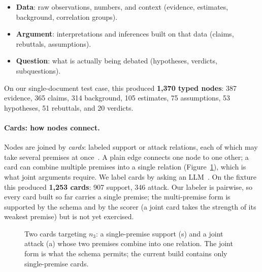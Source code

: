 \documentclass{article}
\begin{document}
\begin{itemize}
    \item \textbf{Data}: raw observations, numbers, and context (evidence,
        estimates, background, correlation groups).
    \item \textbf{Argument}: interpretations and inferences built on that data
        (claims, rebuttals, assumptions).
    \item \textbf{Question}: what is actually being debated (hypotheses,
        verdicts, subquestions).
\end{itemize}

On our single-document test case, this produced \textbf{1{,}370 typed nodes}:
387 evidence, 365 claims, 314 background, 105 estimates, 75 assumptions, 53
hypotheses, 51 rebuttals, and 20 verdicts.

\paragraph{Cards: how nodes connect.}
Nodes are joined by \emph{cards}: labeled support or attack relations, each of
which may take several premises at once~\cite{cayrol2005baf,rago2016dfquad}. A
plain edge connects one node to one other; a card can combine multiple premises
into a single relation (Figure~\ref{fig:cards}), which is what joint arguments
require. We label cards by asking an LLM~\cite{gorur2024argmining}. On the
fixture this produced \textbf{1{,}253 cards}: 907 support, 346 attack. Our
labeler is pairwise, so every card built so far carries a single premise; the
multi-premise form is supported by the schema and by the scorer (a joint card
takes the strength of its weakest premise) but is not yet exercised.
 
\begin{figure}[t]
\centering
{}
\caption{Two cards targeting $n_3$: a single-premise support (s) and a
joint attack (a) whose two premises combine into one relation. The joint form is
what the schema permits; the current build contains only single-premise cards.}
\label{fig:cards}
\end{figure}
\end{document}
